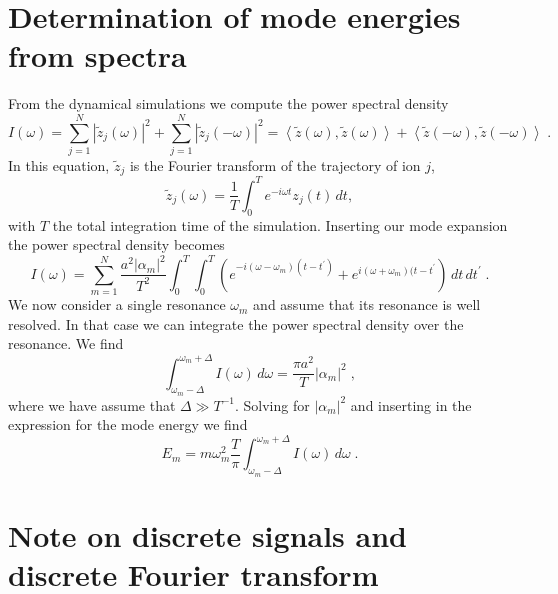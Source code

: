 \documentclass[aps, pra, preprint]{revtex4-1}
\begin{document}
\section{Determination of mode energies from spectra}

From the dynamical simulations we compute the power spectral
density
\begin{equation}
  I(\omega) =
    \sum_{j=1}^N\left| \tilde{z}_j(\omega) \right|^2 +
    \sum_{j=1}^N\left| \tilde{z}_j(-\omega) \right|^2 =
    \left\langle \tilde{z}(\omega), \tilde{z}(\omega)\right \rangle +
    \left\langle \tilde{z}(-\omega), \tilde{z}(-\omega)\right \rangle 
    \;.\label{eqn:psd}
\end{equation}
In this equation, $\tilde{z}_j$ is the Fourier transform of the
trajectory of ion $j$,
\begin{equation}
  \tilde{z}_j(\omega) = \frac{1}{T}\int_0^T e^{-i\omega t}z_j(t)\, dt,
\end{equation}
with $T$ the total integration time of the simulation. Inserting
our mode expansion the power spectral density becomes
\begin{equation}
  I(\omega) =
  \sum_{m=1}^N\frac{a^2 \left| \alpha_m \right|^2}{T^2}
  \int_0^T\int_0^T\left( e^{-i(\omega-\omega_m)(t-t^\prime)} +
    e^{i(\omega+\omega_m)(t-t^\prime} \right)\,dt\,dt^\prime\;.
\end{equation}
We now consider a single resonance $\omega_m$ and assume that
its resonance is well resolved. In that case we can integrate the
power spectral density over the resonance. We find
\begin{equation}
  \int_{\omega_m-\Delta}^{\omega_m+\Delta} I(\omega)\,d\omega =
  \frac{\pi a^2}{T}\left| \alpha_m \right|^2\;,
\end{equation}
where we have assume that $\Delta\gg T^{-1}$. Solving for
$|\alpha_m|^2$ and inserting in the expression for the mode
energy we find
\begin{equation}
  E_m = m\omega_m^2\frac{T}{\pi}
        \int_{\omega_m-\Delta}^{\omega_m+\Delta}I(\omega)\,d\omega\;.
\end{equation} 


\section{Note on discrete signals and discrete Fourier transform}
\end{document}
